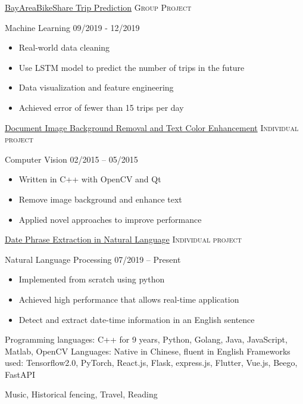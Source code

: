 \documentclass[10pt,a4paper]{article}
\begin{document}
\headedsection
  {\href{https://github.com/itzMeerkat/UCDavis-ECS171-2019Fall-Project}{BayAreaBikeShare Trip Prediction}}
  {\textsc{Group Project}} {
  \headedsubsection
    {Machine Learning}
    {09/2019 - 12/2019}
    {\begin{itemize}
      \item Real-world data cleaning
      \item Use LSTM model to predict the number of trips in the future
      \item Data visualization and feature engineering
      \item Achieved error of fewer than 15 trips per day
    \end{itemize}}
  }



\vspace{0.5em}
\headedsection
  {\href{https://github.com/itzMeerkat/PrintableNote}{Document Image Background Removal and Text Color Enhancement}}
  {\textsc{Individual project}} {
    \headedsubsection
    {Computer Vision}
    {02/2015 -- 05/2015}
    {\begin{itemize}
      \item Written in C++ with OpenCV and Qt
      \item Remove image background and enhance text
      \item Applied novel approaches to improve performance
    \end{itemize}}
}

\vspace{0.5em}
\headedsection
  {\href{https://github.com/itzMeerkat/ambiguous-date-picker}{Date Phrase Extraction in Natural Language}}
  {\textsc{Individual project}} {
    \headedsubsection
    {Natural Language Processing}
    {07/2019 -- Present}
    {\begin{itemize}
      \item Implemented from scratch using python
      \item Achieved high performance that allows real-time application
      \item Detect and extract date-time information in an English sentence
    \end{itemize}}
}

\vspace{0.5em}
\spacedhrule{0em}{-0.4em}



\inlineheadsection
  {Programming languages:}
  {C++ for 9 years, Python, Golang, Java, JavaScript, Matlab, OpenCV}
  \vspace{0.5em}
\inlineheadsection
  {Languages:}
  {Native in Chinese, fluent in English}
  \vspace{0.5em}
\inlineheadsection
  {Frameworks used:}
  {Tensorflow2.0, PyTorch, React.js, Flask, express.js, Flutter, Vue.js, Beego, FastAPI}
  \vspace{0.5em}

\spacedhrule{1.6em}{-0.4em}


\inlineheadsection
  {}
  {Music, Historical fencing, Travel, Reading}
\end{document}
